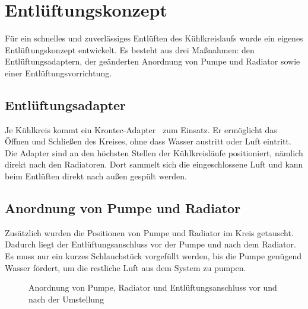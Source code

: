 \section{Entlüftungskonzept}
\label{sec:entlueftung}

Für ein schnelles und zuverlässiges Entlüften des Kühlkreislaufs wurde ein
eigenes Entlüftungskonzept entwickelt. Es besteht aus drei Maßnahmen:
den Entlüftungsadaptern, der geänderten Anordnung von Pumpe und Radiator
sowie einer Entlüftungsvorrichtung.

\subsection{Entlüftungsadapter}
\label{subsec:entlueftungsadapter}

Je Kühlkreis kommt ein Krontec-Adapter~\cite{TODO_Datenblatt_Krontec} zum
Einsatz. Er ermöglicht das Öffnen und Schließen des Kreises, ohne dass Wasser
austritt oder Luft eintritt. Die Adapter sind an den höchsten Stellen der
Kühlkreisläufe positioniert, nämlich direkt nach den Radiatoren. Dort sammelt
sich die eingeschlossene Luft und kann beim Entlüften direkt nach außen
gespült werden.


\subsection{Anordnung von Pumpe und Radiator}
\label{subsec:anordnung_pumpe_radiator}

Zusätzlich wurden die Positionen von Pumpe und Radiator im Kreis getauscht.
Dadurch liegt der Entlüftungsanschluss vor der Pumpe und nach dem Radiator.
Es muss nur ein kurzes Schlauchstück vorgefüllt werden, bis die Pumpe
genügend Wasser fördert, um die restliche Luft aus dem System zu pumpen.

\begin{figure}[htbp]
    \centering
    \caption{Anordnung von Pumpe, Radiator und Entlüftungsanschluss vor und
             nach der Umstellung}
    \label{fig:kuehlkreis_layout}
\end{figure}


